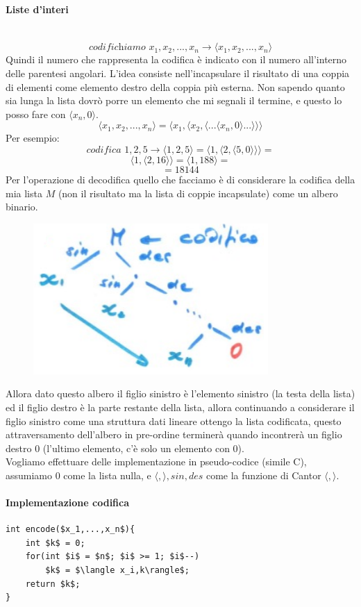 \documentclass{article}
\begin{document}
\paragraph{Liste d'interi}\mbox{}\\
$$\textit{codifichiamo } x_1,x_2,...,x_n\rightarrow\langle x_1,x_2,...,x_n\rangle$$
Quindi il numero che rappresenta la codifica è indicato con il numero all'interno delle parentesi angolari.
L'idea consiste nell'incapsulare il risultato di una coppia di elementi come elemento destro
della coppia più esterna. Non sapendo quanto sia lunga la lista dovrò porre un elemento che mi
segnali il termine, e questo lo posso fare con $\langle x_n,0 \rangle$.
$$\langle x_1,x_2,...,x_n\rangle = \langle x_1,\langle x_2,\langle ...\langle x_n,0\rangle ...\rangle\rangle\rangle$$
Per esempio:
$$\textit{codifica }1,2,5\rightarrow\langle 1,2,5\rangle=\langle 1,\langle 2,\langle 5,0\rangle\rangle\rangle=$$
$$\langle 1,\langle2,16\rangle\rangle=\langle 1,188\rangle=$$
$$=18144$$
Per l'operazione di decodifica quello che facciamo è di considerare la codifica della mia lista $M$ (non il
risultato ma la lista di coppie incapsulate) come un albero binario.
\begin{figure}[H]
    \centering
    \includegraphics[scale=0.5]{images/bin.png}
\end{figure}
Allora dato questo albero il figlio
sinistro è l'elemento sinistro (la testa della lista) ed il figlio destro è la parte restante della lista,
allora continuando a considerare il figlio sinistro come una struttura dati lineare ottengo
la lista codificata, questo attraversamento dell'albero in pre-ordine terminerà quando incontrerà un
figlio destro $0$ (l'ultimo elemento, c'è solo un elemento  con $0$).\\Vogliamo effettuare
delle implementazione in pseudo-codice (simile C), assumiamo $0$ come la lista nulla, e $\langle,\rangle,sin,des$
come la funzione di Cantor $\langle , \rangle$.
\paragraph{Implementazione codifica}\mbox{}
\begin{lstlisting}[mathescape=true]
int encode($x_1,...,x_n$){
    int $k$ = 0;
    for(int $i$ = $n$; $i$ >= 1; $i$--)
        $k$ = $\langle x_i,k\rangle$;
    return $k$;
}
\end{lstlisting}
\end{document}
